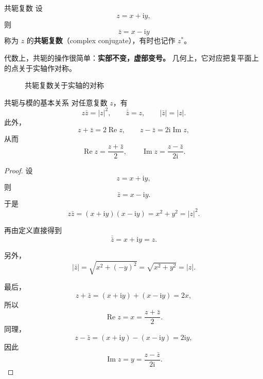 \begin{dingliyi}{共轭复数}{}
设
\[
z=x+\mathrm{i}y,
\]
则
\begin{equation}
    \bar z=x-\mathrm{i}y
\end{equation}
称为 $z$ 的\textbf{共轭复数}（complex conjugate），有时也记作 $z^*$。
\end{dingliyi}

代数上，共轭的操作很简单：\textbf{实部不变，虚部变号。} 几何上，它对应把复平面上的点关于实轴作对称。

\begin{figure}[htbp]
\centering
{}
\caption{共轭复数关于实轴的对称}
\label{fig:complex-conjugate}
\end{figure}

\begin{dingli}{共轭与模的基本关系}{}
对任意复数 $z$，有
\begin{equation}
    z\bar z=|z|^2,\qquad \overline{\bar z}=z,\qquad |\bar z|=|z|.
\end{equation}
此外，
\begin{equation}
    z+\bar z=2\operatorname{Re}z,\qquad
    z-\bar z=2\mathrm{i}\operatorname{Im}z,
\end{equation}
从而
\begin{equation}
    \operatorname{Re}z=\frac{z+\bar z}{2},\qquad
    \operatorname{Im}z=\frac{z-\bar z}{2\mathrm{i}}.
\end{equation}
\end{dingli}

\begin{proof}
设
\[
z=x+\mathrm{i}y,
\]
则
\[
\bar z=x-\mathrm{i}y.
\]
于是
\[
z\bar z=(x+\mathrm{i}y)(x-\mathrm{i}y)=x^2+y^2=|z|^2.
\]

再由定义直接得到
\[
\overline{\bar z}=x+\mathrm{i}y=z.
\]

另外，
\[
|\bar z|=\sqrt{x^2+(-y)^2}=\sqrt{x^2+y^2}=|z|.
\]

最后，
\[
z+\bar z=(x+\mathrm{i}y)+(x-\mathrm{i}y)=2x,
\]
所以
\[
\operatorname{Re}z=x=\frac{z+\bar z}{2}.
\]
同理，
\[
z-\bar z=(x+\mathrm{i}y)-(x-\mathrm{i}y)=2\mathrm{i}y,
\]
因此
\[
\operatorname{Im}z=y=\frac{z-\bar z}{2\mathrm{i}}.
\]
\end{proof}

